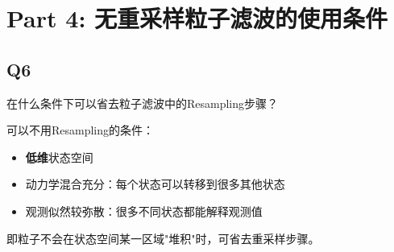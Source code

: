 \documentclass[12pt]{article}
\begin{document}
\section*{Part 4: 无重采样粒子滤波的使用条件}

\subsection*{Q6}

\begin{tcolorbox}[questionbox]
在什么条件下可以省去粒子滤波中的Resampling步骤？
\end{tcolorbox}

\begin{tcolorbox}[answerbox]
可以不用Resampling的条件：
\begin{itemize}
  \item \textbf{低维}状态空间
  \item 动力学混合充分：每个状态可以转移到很多其他状态
  \item 观测似然较弥散：很多不同状态都能解释观测值
\end{itemize}
即粒子不会在状态空间某一区域"堆积"时，可省去重采样步骤。
\end{tcolorbox}
\end{document}
